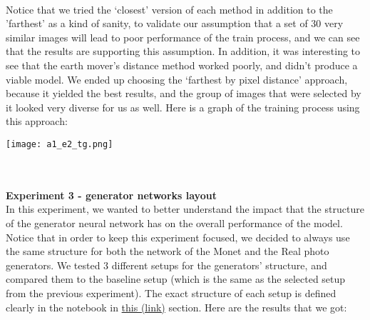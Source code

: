 \documentclass{article}
\begin{document}
\begin{table}[!ht]
    \centering
\end{table}
\\
Notice that we tried the ‘closest’ version of each method in addition to the ’farthest’ as a kind of sanity, to validate our assumption that a set of 30 very similar images will lead to poor performance of the train process, and we can see that the results are supporting this assumption. In addition, it was interesting to see that the earth mover’s distance method worked poorly, and didn’t produce a viable model.
We ended up choosing the ‘farthest by pixel distance’ approach, because it yielded the best results, and the group of images that were selected by it looked very diverse for us as well. Here is a graph of the training process using this approach:

\begin{center}
    \texttt{[image: a1\_e2\_tg.png]}
\end{center}
\\\\
\newblock
\textbf{Experiment 3 - generator networks layout}
\\
In this experiment, we wanted to better understand the impact that the structure of the generator neural network has on the overall performance of the model. Notice that in order to keep this experiment focused, we decided to always use the same structure for both the network of the Monet and the Real photo generators. We tested 3 different setups for the generators’ structure, and compared them to the baseline setup (which is the same as the selected setup from the previous experiment). The exact structure of each setup is defined clearly in the notebook in \href{https://colab.research.google.com/drive/1HVOYKNO_Wr5gIPydsSINsGEhfxGbsWXr?usp=sharing#scrollTo=Build_generator_model}{this (link)} section. Here are the results that we got:
\end{document}
